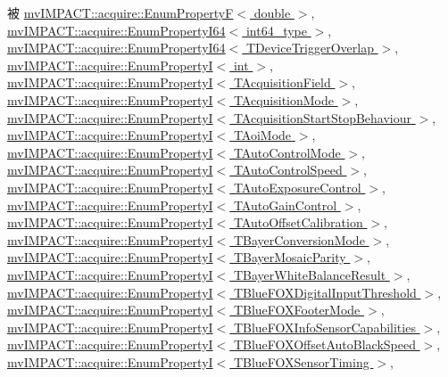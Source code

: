 被 \hyperlink{classmv_i_m_p_a_c_t_1_1acquire_1_1_enum_property_f}{mv\+I\+M\+P\+A\+C\+T\+::acquire\+::\+Enum\+Property\+F$<$ double $>$}, \hyperlink{classmv_i_m_p_a_c_t_1_1acquire_1_1_enum_property_i64}{mv\+I\+M\+P\+A\+C\+T\+::acquire\+::\+Enum\+Property\+I64$<$ int64\+\_\+type $>$}, \hyperlink{classmv_i_m_p_a_c_t_1_1acquire_1_1_enum_property_i64}{mv\+I\+M\+P\+A\+C\+T\+::acquire\+::\+Enum\+Property\+I64$<$ T\+Device\+Trigger\+Overlap $>$}, \hyperlink{classmv_i_m_p_a_c_t_1_1acquire_1_1_enum_property_i}{mv\+I\+M\+P\+A\+C\+T\+::acquire\+::\+Enum\+Property\+I$<$ int $>$}, \hyperlink{classmv_i_m_p_a_c_t_1_1acquire_1_1_enum_property_i}{mv\+I\+M\+P\+A\+C\+T\+::acquire\+::\+Enum\+Property\+I$<$ T\+Acquisition\+Field $>$}, \hyperlink{classmv_i_m_p_a_c_t_1_1acquire_1_1_enum_property_i}{mv\+I\+M\+P\+A\+C\+T\+::acquire\+::\+Enum\+Property\+I$<$ T\+Acquisition\+Mode $>$}, \hyperlink{classmv_i_m_p_a_c_t_1_1acquire_1_1_enum_property_i}{mv\+I\+M\+P\+A\+C\+T\+::acquire\+::\+Enum\+Property\+I$<$ T\+Acquisition\+Start\+Stop\+Behaviour $>$}, \hyperlink{classmv_i_m_p_a_c_t_1_1acquire_1_1_enum_property_i}{mv\+I\+M\+P\+A\+C\+T\+::acquire\+::\+Enum\+Property\+I$<$ T\+Aoi\+Mode $>$}, \hyperlink{classmv_i_m_p_a_c_t_1_1acquire_1_1_enum_property_i}{mv\+I\+M\+P\+A\+C\+T\+::acquire\+::\+Enum\+Property\+I$<$ T\+Auto\+Control\+Mode $>$}, \hyperlink{classmv_i_m_p_a_c_t_1_1acquire_1_1_enum_property_i}{mv\+I\+M\+P\+A\+C\+T\+::acquire\+::\+Enum\+Property\+I$<$ T\+Auto\+Control\+Speed $>$}, \hyperlink{classmv_i_m_p_a_c_t_1_1acquire_1_1_enum_property_i}{mv\+I\+M\+P\+A\+C\+T\+::acquire\+::\+Enum\+Property\+I$<$ T\+Auto\+Exposure\+Control $>$}, \hyperlink{classmv_i_m_p_a_c_t_1_1acquire_1_1_enum_property_i}{mv\+I\+M\+P\+A\+C\+T\+::acquire\+::\+Enum\+Property\+I$<$ T\+Auto\+Gain\+Control $>$}, \hyperlink{classmv_i_m_p_a_c_t_1_1acquire_1_1_enum_property_i}{mv\+I\+M\+P\+A\+C\+T\+::acquire\+::\+Enum\+Property\+I$<$ T\+Auto\+Offset\+Calibration $>$}, \hyperlink{classmv_i_m_p_a_c_t_1_1acquire_1_1_enum_property_i}{mv\+I\+M\+P\+A\+C\+T\+::acquire\+::\+Enum\+Property\+I$<$ T\+Bayer\+Conversion\+Mode $>$}, \hyperlink{classmv_i_m_p_a_c_t_1_1acquire_1_1_enum_property_i}{mv\+I\+M\+P\+A\+C\+T\+::acquire\+::\+Enum\+Property\+I$<$ T\+Bayer\+Mosaic\+Parity $>$}, \hyperlink{classmv_i_m_p_a_c_t_1_1acquire_1_1_enum_property_i}{mv\+I\+M\+P\+A\+C\+T\+::acquire\+::\+Enum\+Property\+I$<$ T\+Bayer\+White\+Balance\+Result $>$}, \hyperlink{classmv_i_m_p_a_c_t_1_1acquire_1_1_enum_property_i}{mv\+I\+M\+P\+A\+C\+T\+::acquire\+::\+Enum\+Property\+I$<$ T\+Blue\+F\+O\+X\+Digital\+Input\+Threshold $>$}, \hyperlink{classmv_i_m_p_a_c_t_1_1acquire_1_1_enum_property_i}{mv\+I\+M\+P\+A\+C\+T\+::acquire\+::\+Enum\+Property\+I$<$ T\+Blue\+F\+O\+X\+Footer\+Mode $>$}, \hyperlink{classmv_i_m_p_a_c_t_1_1acquire_1_1_enum_property_i}{mv\+I\+M\+P\+A\+C\+T\+::acquire\+::\+Enum\+Property\+I$<$ T\+Blue\+F\+O\+X\+Info\+Sensor\+Capabilities $>$}, \hyperlink{classmv_i_m_p_a_c_t_1_1acquire_1_1_enum_property_i}{mv\+I\+M\+P\+A\+C\+T\+::acquire\+::\+Enum\+Property\+I$<$ T\+Blue\+F\+O\+X\+Offset\+Auto\+Black\+Speed $>$}, \hyperlink{classmv_i_m_p_a_c_t_1_1acquire_1_1_enum_property_i}{mv\+I\+M\+P\+A\+C\+T\+::acquire\+::\+Enum\+Property\+I$<$ T\+Blue\+F\+O\+X\+Sensor\+Timing $>$}, 
